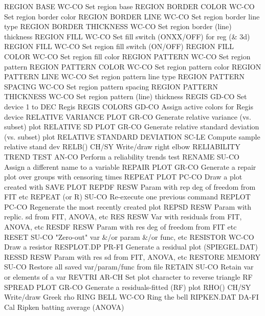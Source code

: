 REGION BASE                 WC-CO Set region base
REGION BORDER COLOR         WC-CO Set region border color
REGION BORDER LINE          WC-CO Set region border line type
REGION BORDER THICKNESS     WC-CO Set region border (line) thickness
REGION FILL                 WC-CO Set fill switch (ONXX/OFF) for reg (& 3d)
REGION FILL                 WC-CO Set region fill switch (ON/OFF)
REGION FILL COLOR           WC-CO Set region fill color
REGION PATTERN              WC-CO Set region pattern
REGION PATTERN COLOR        WC-CO Set region pattern color
REGION PATTERN LINE         WC-CO Set region pattern line type
REGION PATTERN SPACING      WC-CO Set region pattern spacing
REGION PATTERN THICKNESS    WC-CO Set region pattern (line) thickness
REGIS                       GD-CO Set device 1 to DEC Regis
REGIS COLORS                GD-CO Assign active colors for Regis device
RELATIVE VARIANCE PLOT      GR-CO Generate relative variance (vs. subset) plot
RELATIVE SD PLOT            GR-CO Generate relative standard deviation (vs. subset) plot
RELATIVE STANDARD DEVIATION SC-LE Compute sample relative stand dev
RELB()                      CH/SY Write/draw right elbow
RELIABILITY TREND TEST      AN-CO Perform a reliability trends test
RENAME                      SU-CO Assign a different name to a variable
REPAIR PLOT                 GR-CO Generate a repair plot over groups with censoring times
REPEAT PLOT                 PC-CO Draw a plot created with SAVE PLOT
REPDF                       RESW  Param with rep deg of freedom from FIT etc
REPEAT (or R)               SU-CO Re-execute one previous command
REPLOT                      PC-CO Regenerate the most recently created plot
REPSD                       RESW  Param with replic. sd from FIT, ANOVA, etc
RES                         RESW  Var with residuals from FIT, ANOVA, etc
RESDF                       RESW  Param with res deg of freedom from FIT etc
RESET                       SU-CO "Zero-out" var &/or param &/or func, etc
RESISTOR                    WC-CO Draw a resistor
RESPLOT.DP                  PR-FI Generate a residual plot (SPIEGEL.DAT)
RESSD                       RESW  Param with res sd from FIT, ANOVA, etc
RESTORE MEMORY              SU-CO Restore all saved var/param/func from file
RETAIN                      SU-CO Retain var or elements of a var
REVTRI                      AR-CH Set plot character to reverse triangle
RF SPREAD PLOT              GR-CO Generate a residuals-fitted (RF)  plot
RHO()                       CH/SY Write/draw Greek rho
RING BELL                   WC-CO Ring the bell
RIPKEN.DAT                  DA-FI Cal Ripken batting average (ANOVA)
